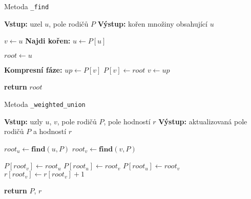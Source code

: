 \begin{algorithm}
    \caption{Metoda \texttt{\_find}}
    \begin{algorithmic}[1]
        \STATE \textbf{Vstup:} uzel $u$, pole rodičů $P$
        \STATE \textbf{Výstup:} kořen množiny obsahující $u$

        \STATE $v \gets u$ 
        \STATE \textbf{Najdi kořen:}
            \STATE $u \gets P[u]$ 
        \ENDWHILE

        \STATE $root \gets u$

        \STATE \textbf{Kompresní fáze:}
            \STATE $up \gets P[v]$ 
            \STATE $P[v] \gets root$ 
            \STATE $v \gets up$ 
        \ENDWHILE

        \STATE \textbf{return} $root$ 
    \end{algorithmic}
\end{algorithm}

\begin{algorithm}
    \caption{Metoda \texttt{\_weighted\_union}}
    \begin{algorithmic}[1]
        \STATE \textbf{Vstup:} uzly $u$, $v$, pole rodičů $P$, pole hodností $r$
        \STATE \textbf{Výstup:} aktualizovaná pole rodičů $P$ a hodností $r$

        \STATE $root_u \gets \textbf{find}(u, P)$ 
        \STATE $root_v \gets \textbf{find}(v, P)$ 

                \STATE $P[root_v] \gets root_u$ 
                \STATE $P[root_u] \gets root_v$ 
            \ELSE 
                \STATE $P[root_u] \gets root_v$ 
                \STATE $r[root_v] \gets r[root_v] + 1$ 
            \ENDIF
        \ENDIF

        \STATE \textbf{return} $P$, $r$ 
    \end{algorithmic}
\end{algorithm}

